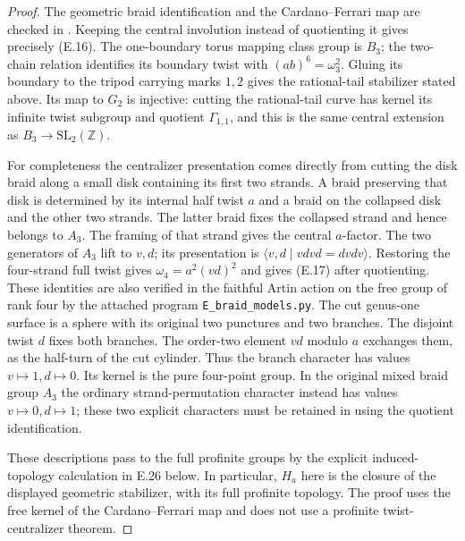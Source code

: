 \begin{proof}
The geometric braid identification and the Cardano--Ferrari
map are checked in \cite[Corollary C; proof of Proposition
3.2(i), especially (3.1)--(3.5)]{ET_MN2022}.  Keeping the central
involution instead of quotienting it gives precisely (E.16).
The one-boundary torus mapping class group is $B_3$; the
two-chain relation identifies its boundary twist with
$(ab)^6=\omega _3^2$.  Gluing its boundary to the tripod
carrying marks $1,2$ gives the rational-tail stabilizer stated
above.  Its map to $G_2$ is injective: cutting the rational-tail
curve has kernel its infinite twist subgroup and quotient
$\Gamma_{1,1}$, and this is the same central extension as
$B_3\to\mathrm{SL}_2(\mathbb Z)$.

For completeness the centralizer presentation comes directly
from cutting the disk braid along a small disk containing its
first two strands.  A braid preserving that disk is determined
by its internal half twist $a$ and a braid on the collapsed disk
and the other two strands.  The latter braid fixes the collapsed
strand and hence belongs to $A_3$.  The framing of that strand
gives the central $a$-factor.  The two generators of $A_3$ lift
to $v,d$; its presentation is
$\langle v,d\mid vdvd=dvdv\rangle$.
Restoring the four-strand full twist gives
$\omega _4=a^2(vd)^2$ and gives (E.17) after quotienting.
These identities are also verified in the faithful Artin action
on the free group of rank four by the attached program
\texttt{E\_braid\_models.py}.
The cut genus-one surface is a sphere with its original two
punctures and two branches.  The disjoint twist $d$ fixes both
branches.  The order-two element $vd$ modulo $a$ exchanges
them, as the half-turn of the cut cylinder.  Thus the branch
character has values $v\mapsto1,d\mapsto0$.  Its kernel is
the pure four-point group.  In the original mixed braid group
$A_3$ the ordinary strand-permutation character instead has
values $v\mapsto0,d\mapsto1$; these two explicit characters
must be retained in using the quotient identification.

These descriptions pass to the full profinite groups by the
explicit induced-topology calculation in E.26 below.  In
particular, $H_a$ here is the closure of the displayed
geometric stabilizer, with its full profinite topology.
The proof uses the free kernel of the Cardano--Ferrari map
and does not use a profinite twist-centralizer theorem.


\end{proof}
